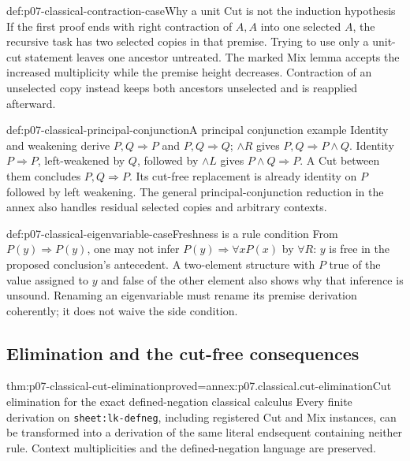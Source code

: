 \begin{hbexample}{def:p07-classical-contraction-case}{Why a unit Cut is not the induction hypothesis}
If the first proof ends with right contraction of \(A,A\) into one selected
\(A\), the recursive task has two selected copies in that premise.
Trying to use only a unit-cut statement leaves one ancestor untreated.
The marked Mix lemma accepts the increased multiplicity while the premise
height decreases. Contraction of an unselected copy instead keeps both
ancestors unselected and is reapplied afterward.
\end{hbexample}

\begin{hbexample}{def:p07-classical-principal-conjunction}{A principal conjunction example}
Identity and weakening derive \(P,Q\Rightarrow P\) and
\(P,Q\Rightarrow Q\); \(\land R\) gives
\(P,Q\Rightarrow P\land Q\).
Identity \(P\Rightarrow P\), left-weakened by \(Q\), followed by
\(\land L\) gives \(P\land Q\Rightarrow P\).
A Cut between them concludes \(P,Q\Rightarrow P\).
Its cut-free replacement is already identity on \(P\) followed by left
weakening. The general principal-conjunction reduction in the annex also
handles residual selected copies and arbitrary contexts.
\end{hbexample}

\begin{hbexample}{def:p07-classical-eigenvariable-case}{Freshness is a rule condition}
From \(P(y)\Rightarrow P(y)\), one may not infer
\(P(y)\Rightarrow\forall xP(x)\) by \(\forall R\): \(y\) is free in
the proposed conclusion's antecedent. A two-element structure with \(P\)
true of the value assigned to \(y\) and false of the other element also
shows why that inference is unsound. Renaming an eigenvariable must rename
its premise derivation coherently; it does not waive the side condition.
\end{hbexample}

\subsection{Elimination and the cut-free consequences}

\begin{hbtheorem}{thm:p07-classical-cut-elimination}{proved=annex:p07.classical.cut-elimination}{Cut elimination for the exact defined-negation classical calculus}
Every finite derivation on \texttt{sheet:lk-defneg}, including registered
Cut and Mix instances, can be transformed into a derivation of the same
literal endsequent containing neither rule. Context multiplicities and
the defined-negation language are preserved.
\end{hbtheorem}

